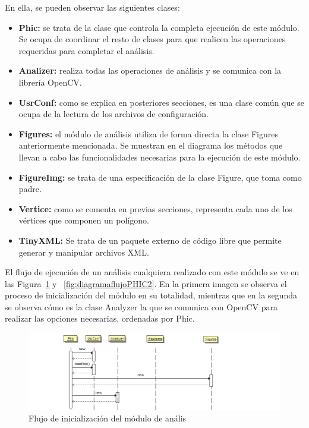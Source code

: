 En ella, se pueden observar las siguientes clases:\\

\begin{itemize}

	\item \textbf{Phic:} se trata de la clase que controla la completa ejecución de este módulo. Se ocupa de coordinar el resto de clases para que realicen las operaciones requeridas para completar el análisis.
	
	\item \textbf{Analizer:} realiza todas las operaciones de análisis y se comunica con la librería OpenCV.
	
	\item \textbf{UsrConf:} como se explica en posteriores secciones, es una clase común que se ocupa de la lectura de los archivos de configuración.
	
	\item \textbf{Figures:} el módulo de análisis utiliza de forma directa la clase Figures anteriormente mencionada. Se muestran en el diagrama los métodos que llevan a cabo las funcionalidades necesarias para la ejecución de este módulo.
	
	\item \textbf{FigureImg:} se trata de una especificación de la clase Figure, que toma como padre.
	
	\item \textbf{Vertice:} como se comenta en previas secciones, representa cada uno de los vértices que componen un polígono. 
	
	\item \textbf{TinyXML:} Se trata de un paquete externo de código libre que permite generar y manipular archivos XML.
	
	
\end{itemize}
			
El flujo de ejecución de un análisis cualquiera realizado con este módulo se ve en las Figura~\ref{fig:diagramaflujoPHIC1} y ~\ref{fig:diagramaflujoPHIC2}. En la primera imagen se observa el proceso de inicialización del módulo en su totalidad, mientras que en la segunda se observa cómo es la clase Analyzer la que se comunica con OpenCV para realizar las opciones necesarias, ordenadas por Phic.\\

		\begin{figure}[htbp]
		\centering
		\includegraphics[scale=0.47]{graphics/diagramaflujoPHIC1.png}
		\caption{Flujo de inicialización del módulo de anális}
		\label{fig:diagramaflujoPHIC1}
		\end{figure}
		
